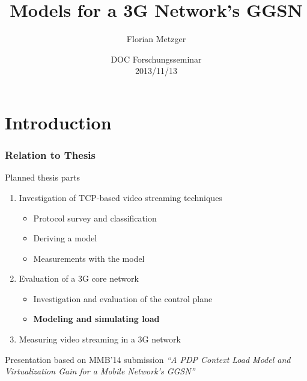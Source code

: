 \documentclass{beamer}
\title[GGSN Models]{Models for a 3G Network's GGSN}
\author{Florian Metzger}
\institute[University of Vienna]
{
	University of Vienna\\
  	Faculty of Computer Science

}
\date[Forschungsseminar WS13/14]{DOC Forschungsseminar\\ 2013/11/13}
\begin{document}
\frame{\titlepage}


\section{Introduction}

\begin{frame}
	\frametitle{Relation to Thesis}

	Planned thesis parts
	\begin{enumerate}
		\item Investigation of TCP-based video streaming techniques
			\begin{itemize}
				\item Protocol survey and classification
				\item Deriving a model
				\item Measurements with the model
			\end{itemize}
		\item Evaluation of a 3G core network
			\begin{itemize}
				\item Investigation and evaluation of the control plane
				\item \textbf{Modeling and simulating load}
			\end{itemize}
		\item Measuring video streaming in a 3G network 
	\end{enumerate}

	Presentation based on MMB'14 submission \textit{``A PDP Context Load Model and Virtualization
Gain for a Mobile Network's GGSN''}

\end{frame}
\end{document}

